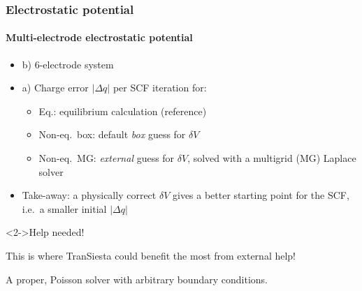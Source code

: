 \begin{frame}
  \frametitle{Electrostatic potential}
  \framesubtitle{Multi-electrode electrostatic potential}

  \begin{itemize}
    \item b) 6-electrode system
    \item a) Charge error $|\Delta q|$ per SCF iteration for:
    \begin{itemize}
      \item Eq.: equilibrium calculation (reference)
      \item Non-eq.\ box: default \emph{box} guess for $\delta V$
      \item Non-eq.\ MG: \emph{external} guess for $\delta V$, solved with a multigrid (MG)
      Laplace solver
    \end{itemize}
    \item<2-> Take-away: a physically correct $\delta V$ gives a better starting point for
    the SCF, i.e.\ a smaller initial $|\Delta q|$
  \end{itemize}

  \begin{center}
  \end{center}

  \begin{block}<2->{Help needed!}

    This is where TranSiesta could benefit the most from external help!

    A proper, Poisson solver with arbitrary boundary conditions.

  \end{block}

\end{frame}
